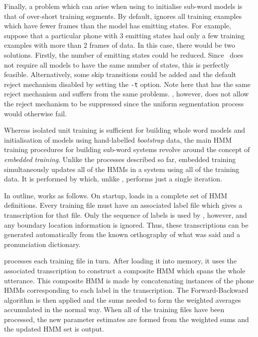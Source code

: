Finally, a problem which can arise when
using   to initialise sub-word models 
is that of over-short training 
segments.  By default, 
 ignores all training examples which have fewer frames than
the model has emitting states.    For example, suppose that a 
particular phone with 3 emitting states had only a few training
examples with more than 2 frames of data.  In this case, there would be two
solutions.  Firstly, the number of emitting states could be reduced.  Since
\HTK\ does not require all models to have the same number of states,
this is perfectly feasible.
Alternatively, some skip transitions could be added and the default
reject mechanism disabled by setting the \texttt{-t} option.
Note here that  has the same reject mechanism and suffers
from the same problems.  , however, does not allow
the reject mechanism to be suppressed since the uniform segmentation
process would otherwise fail.


Whereas isolated unit training is sufficient for  building whole  word
models and initialisation of models using hand-labelled \textit{bootstrap}
data,  the main HMM training procedures for building sub-word systems
revolve around the  concept of \textit{embedded training}. Unlike the
processes described so far,  embedded training simultaneously updates all
of the HMMs in a system using all of the training data.  It is performed by
 which, unlike , performs just a single iteration.  

In outline,  works as follows.  On startup,  
loads in a complete
set of HMM definitions.  Every training file must have an associated
label file which gives a transcription for that file.  Only the
sequence of labels is used by , however, and any boundary location
information is ignored.  Thus, these transcriptions can be generated
automatically from the known orthography of what was said and 
a pronunciation dictionary.

 processes each training file in turn.  After loading it into memory,
it uses the associated transcription to 
construct a  composite HMM which spans the whole utterance.
This composite HMM is made by concatenating instances of the phone HMMs 
corresponding to each label in the transcription.  The Forward-Backward
algorithm is then applied and the sums needed to form the weighted
averages accumulated in the normal way.  When all of the training
files have been processed, the new parameter estimates are formed
from the weighted sums and the updated HMM set is output.

